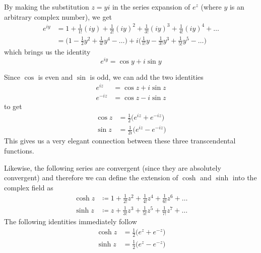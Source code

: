     \begin{definition}
      \label{def:eulers-formula}
      By making the substitution $z = yi$ in the series expansion of $e^z$ (where $y$ is an arbitrary complex number), we get 
      \begin{align*}
          e^{iy} & = 1 + \frac{1}{1!} (iy) + \frac{1}{2!}(iy)^2 + \frac{1}{3!} (iy)^3 + \frac{1}{4!} (iy)^4 + \ldots \\
          & = \bigg(1 - \frac{1}{2} y^2 + \frac{1}{4!} y^4 - \ldots \bigg) + i \bigg(\frac{1}{1!} y - \frac{1}{3!} y^3 + \frac{1}{5!} y^5 - \ldots \bigg)
      \end{align*}
      which brings us the identity
      \begin{equation}
        e^{iy} = \cos{y} + i \sin{y}
      \end{equation}
    \end{definition}

    Since $\cos$ is even and $\sin$ is odd, we can add the two identities
    \begin{align*}
        e^{iz} & = \cos{z} + i \sin{z} \\
        e^{-iz} & = \cos{z} - i \sin{z} 
    \end{align*}
    to get 
    \begin{align*}
        \cos{z} & = \frac{1}{2}\big( e^{iz} + e^{-iz} \big) \\
        \sin{z} & = \frac{1}{2i} \big( e^{iz} - e^{-iz} \big)
    \end{align*}
    This gives us a very elegant connection between these three transcendental functions. 

    \begin{definition}
      \label{def:hyperbolic-functions}
      Likewise, the following series are convergent (since they are absolutely convergent) and therefore we can define the extension of $\cosh$ and $\sinh$ into the complex field as 
      \begin{align*}
          \cosh{z} & \coloneqq 1 + \frac{1}{2!} z^2 + \frac{1}{4!} z^4 + \frac{1}{6!} z^6 + \ldots \\
          \sinh{z} & \coloneqq z + \frac{1}{3!} z^3 + \frac{1}{5!} z^5 + \frac{1}{7!} z^7 + \ldots 
      \end{align*}
      The following identities immediately follow
      \begin{align*}
          \cosh{z} & = \frac{1}{2} \big( e^z + e^{-z} \big) \\
          \sinh{z} & = \frac{1}{2} \big( e^{z} - e^{-z}\big) 
      \end{align*}
    \end{definition}


